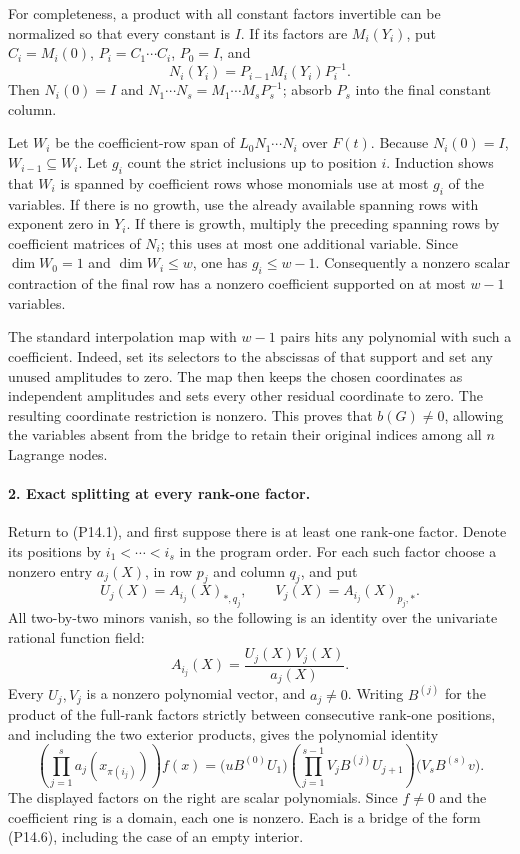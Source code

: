 For completeness, a product with all constant factors invertible
can be normalized so that every constant is $I$. If its factors
are $M_i(Y_i)$, put $C_i=M_i(0)$, $P_i=C_1\cdots C_i$, $P_0=I$,
and
\[
 N_i(Y_i)=P_{i-1}M_i(Y_i)P_i^{-1}.
\]
Then $N_i(0)=I$ and
$N_1\cdots N_s=M_1\cdots M_sP_s^{-1}$; absorb $P_s$ into
the final constant column.

Let $W_i$ be the coefficient-row span of
$L_0N_1\cdots N_i$ over $F(t)$. Because $N_i(0)=I$,
$W_{i-1}\subseteq W_i$. Let $g_i$ count the strict inclusions
up to position $i$. Induction shows that $W_i$ is spanned by
coefficient rows whose monomials use at most $g_i$ of the
variables. If there is no growth, use the already available
spanning rows with exponent zero in $Y_i$. If there is growth,
multiply the preceding spanning rows by coefficient matrices
of $N_i$; this uses at most one additional variable. Since
$\dim W_0=1$ and $\dim W_i\leq w$, one has $g_i\leq w-1$.
Consequently a nonzero scalar contraction of the final row
has a nonzero coefficient supported on at most $w-1$ variables.

The standard interpolation map with $w-1$ pairs hits any
polynomial with such a coefficient. Indeed, set its selectors
to the abscissas of that support and set any unused amplitudes
to zero. The map then keeps the chosen coordinates as independent
amplitudes and sets every other residual coordinate to zero.
The resulting coordinate restriction is nonzero. This proves
that $b(G)\ne0$, allowing the variables absent from the bridge
to retain their original indices among all $n$ Lagrange nodes.

\paragraph{2. Exact splitting at every rank-one factor.}
Return to (P14.1), and first suppose there is at least one rank-one
factor. Denote its positions by $i_1<\cdots<i_s$ in the program
order. For each such factor choose a nonzero entry $a_j(X)$,
in row $p_j$ and column $q_j$, and put
\[
 U_j(X)=A_{i_j}(X)_{*,q_j},\qquad
 V_j(X)=A_{i_j}(X)_{p_j,*}.
\]
All two-by-two minors vanish, so the following is an identity
over the univariate rational function field:
\[
 A_{i_j}(X)=\frac{U_j(X)V_j(X)}{a_j(X)}.
 \tag{P14.9}
\]
Every $U_j,V_j$ is a nonzero polynomial vector, and $a_j\ne0$.
Writing $B^{(j)}$ for the product of the full-rank factors
strictly between consecutive rank-one positions, and including
the two exterior products, gives the polynomial identity
\[
 \left(\prod_{j=1}^{s}a_j(x_{\pi(i_j)})\right) f(x)
   =\bigl(uB^{(0)}U_1\bigr)
      \left(\prod_{j=1}^{s-1}V_jB^{(j)}U_{j+1}\right)
       \bigl(V_sB^{(s)}v\bigr).
 \tag{P14.10}
\]
The displayed factors on the right are scalar polynomials.
Since $f\ne0$ and the coefficient ring is a domain, each one
is nonzero. Each is a bridge of the form (P14.6), including
the case of an empty interior.

